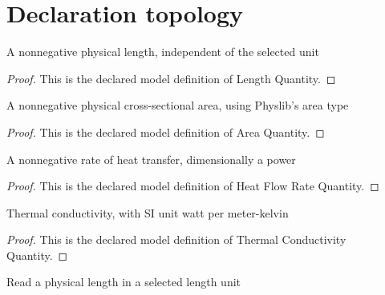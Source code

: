 \section{Declaration topology}
\begin{definition}
  \label{def:physics:phyx-mini-0467:phyxminiproblems-problemphyxmini0467-lengthquantity}
  A nonnegative physical length, independent of the selected unit
\end{definition}
\begin{proof}
  This is the declared model definition of Length Quantity.
\end{proof}
\begin{definition}
  \label{def:physics:phyx-mini-0467:phyxminiproblems-problemphyxmini0467-areaquantity}
  A nonnegative physical cross-sectional area, using Physlib's area type
\end{definition}
\begin{proof}
  This is the declared model definition of Area Quantity.
\end{proof}
\begin{definition}
  \label{def:physics:phyx-mini-0467:phyxminiproblems-problemphyxmini0467-heatflowratequantity}
  A nonnegative rate of heat transfer, dimensionally a power
\end{definition}
\begin{proof}
  This is the declared model definition of Heat Flow Rate Quantity.
\end{proof}
\begin{definition}
  \label{def:physics:phyx-mini-0467:phyxminiproblems-problemphyxmini0467-thermalconductivityquantity}
  Thermal conductivity, with SI unit watt per meter-kelvin
\end{definition}
\begin{proof}
  This is the declared model definition of Thermal Conductivity Quantity.
\end{proof}
\begin{definition}
  \label{def:physics:phyx-mini-0467:phyxminiproblems-problemphyxmini0467-lengthreadout}
  Read a physical length in a selected length unit
\end{definition}
